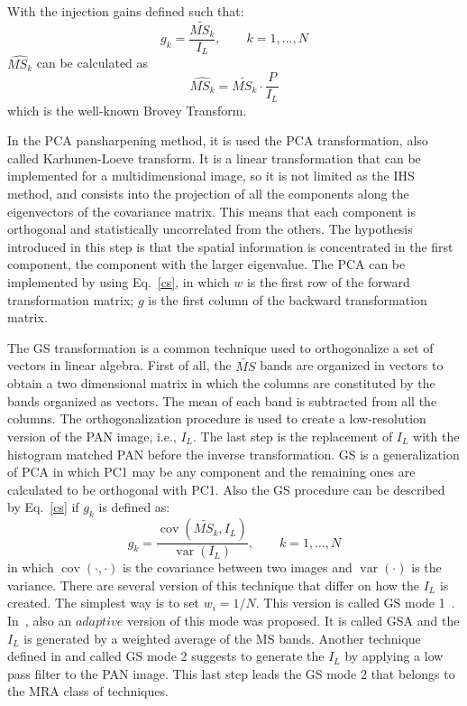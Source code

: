 \documentclass[12pt]{report}
\begin{document}
With the injection gains defined such that:
\begin{equation}
    g_k = \frac{\widetilde{MS_k}}{I_L}, \qquad k = 1,\dots,N
    \label{csgk}
\end{equation}
%
$\widehat{MS_k}$ can be calculated as 
\begin{equation}
    \widehat{MS_k} = \widetilde{MS_k} \cdot \frac{P}{I_L}
    \label{csfinal}
\end{equation}
%
which is the well-known Brovey Transform. 

In the PCA pansharpening method, it is used the PCA transformation, also called Karhunen-Loeve transform. It is a linear transformation that can be implemented for a multidimensional image, so it is not limited as the IHS method, and consists into the projection of all the components along the eigenvectors of the covariance matrix. This means that each component is orthogonal and statistically uncorrelated from the others. The hypothesis introduced in this step is that the spatial information is concentrated in the first component, the component with the larger eigenvalue. The PCA can be implemented by using Eq.~\ref{cs}, in which $w$ is the first row of the forward transformation matrix; $g$ is the first column of the backward transformation matrix.

The GS transformation is a common technique used to orthogonalize a set of vectors in linear algebra.
First of all, the $\widetilde{MS}$ bands are organized in vectors to obtain a two dimensional matrix in which the columns are constituted by the bands organized as vectors. The mean of each band is subtracted from all the columns. The orthogonalization procedure is used to create a low-resolution version of the PAN image, i.e., $I_L$.  The last step is the replacement of $I_L$ with the histogram matched PAN before the inverse transformation. GS is a generalization of PCA in which PC1 may be any component and the remaining ones are calculated to be orthogonal with PC1. Also the GS procedure can be described by Eq.~\ref{cs} if $g_k$ is defined as:
%
\begin{equation}
    g_k = \frac{\operatorname{cov}(\widetilde{MS_k}, I_L)}{\operatorname{var}(I_L)} , \qquad k = 1,\dots,N
    \label{gsgk}
\end{equation}
%
in which $\operatorname{cov}(\cdot,\cdot)$ is the covariance between two images and $\operatorname{var}(\cdot)$ is the variance.
There are several version of this technique that differ on how the $I_L$ is
created. The simplest way is to set $w_i = 1/N$. This version is called 
GS mode 1~\cite{gs}. In~\cite{cs3}, also an $adaptive$ version of this mode was proposed. It is called GSA and the $I_L$ is generated by a weighted average of 
the MS bands. Another technique defined in \cite{gs} and called GS mode 2 
suggests to generate the $I_L$ by applying a low pass filter to the PAN image. 
This last step leads the GS mode 2 that belongs to the MRA class of techniques.
\end{document}
